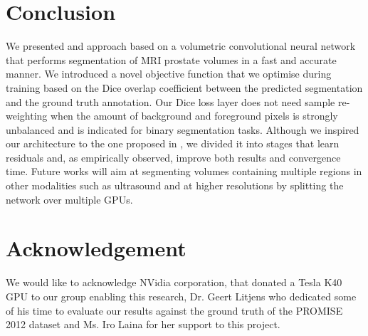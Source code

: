 \section{Conclusion}
We presented and approach based on a volumetric convolutional neural network that performs segmentation of MRI prostate volumes in a fast and accurate manner. We introduced a novel objective function that we optimise during training based on the Dice overlap coefficient between the predicted segmentation and the ground truth annotation. Our Dice loss layer does not need sample re-weighting when the amount of background and foreground pixels is strongly unbalanced and is indicated for binary segmentation tasks. Although we inspired our architecture to the one proposed in \cite{ronneberger2015u}, we divided it into stages that learn residuals and, as empirically observed, improve both results and convergence time. Future works will aim at segmenting volumes containing multiple regions in other modalities such as ultrasound and at higher resolutions by splitting the network over multiple GPUs. 

\section{Acknowledgement}
We would like to acknowledge NVidia corporation, that donated a Tesla K40 GPU to our group enabling this research, Dr. Geert Litjens who dedicated some of his time to evaluate our results against the ground truth of the PROMISE 2012 dataset and Ms. Iro Laina for her support to this project.